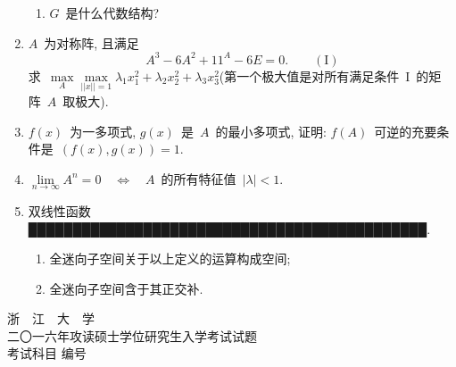 \documentclass[UTF8,a4paper,11pt]{article}
\begin{document}
\begin{enumerate}
\begin{enumerate}
		      \item $G$~是什么代数结构?
	      \end{enumerate}
	      \vspace{2em}
	\item $A$~为对称阵, 且满足
	      \[ A^3-6A^2+11^A-6E=0.\qquad \mathrm{(I)}\]
	      求~$\max\limits_{A}\max\limits_{||x||=1}\lambda_1x_1^2+\lambda_2x_2^2+\lambda_3x_3^2$(第一个极大值是对所有满足条件~I~的矩阵~$A$~取极大).
	      \vspace{2em}
	\item $f(x)$~为一多项式, $g(x)$~是~$A$~的最小多项式, 证明: $f(A)$~可逆的充要条件是~$(f(x),g(x))=1$.
	      \vspace{2em}
	\item $\lim\limits_{n\to\infty}A^n=0$~~$\Leftrightarrow$~~$A$~的所有特征值~$|\lambda|<1$.
	      \vspace{2em}
	\item 双线性函数█████████████████████████████████████████████.
	      \begin{enumerate}
		      \item 全迷向子空间关于以上定义的运算构成空间;
		      \item 全迷向子空间含于其正交补.
	      \end{enumerate}
	      \vspace{2em}
\end{enumerate}

\newpage
\setcounter{page}{1}

\begin{center}
	{\Huge 浙~~江~~大~~学}\\
	\setlength{\parskip}{5pt}
	{\Large 二〇一六年攻读硕士学位研究生入学考试试题}\\
	\setlength{\parskip}{10 pt}
	{\Large 考试科目\underline{} 编号\underline{}}
\end{center}
\end{document}
